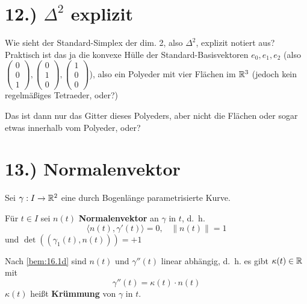 \documentclass[a5paper,oneside]{scrbook}
\begin{document}
\section*{12.) $\Delta^2$ explizit}
Wie sieht der Standard-Simplex der dim. 2, also $\Delta^2$, explizit
notiert aus? Praktisch ist das ja die konvexe Hülle der Standard-Basisvektoren
$e_0, e_1, e_2$ (also $\begin{pmatrix}0\\0\\1\end{pmatrix},\begin{pmatrix}0\\1\\0\end{pmatrix},\begin{pmatrix}1\\0\\0\end{pmatrix}$),
also ein Polyeder mit vier Flächen im $\mathbb{R}^3$ (jedoch kein regelmäßiges Tetraeder, oder?)

Das ist dann nur das Gitter dieses Polyeders, aber nicht die Flächen
oder sogar etwas innerhalb vom Polyeder, oder?

\section*{13.) Normalenvektor}
\begin{definition}%
    Sei $\gamma: I \rightarrow \mathbb{R}^2$ eine durch Bogenlänge
    parametrisierte Kurve.

    \begin{defenum}
        \item Für $t \in I$ sei $n(t)$ \textbf{Normalenvektor}
              an $\gamma$ in $t$, d.~h.
              \[\langle n(t), \gamma'(t) \rangle = 0, \;\;\; \|n(t)\|=1 \]
              und $\det((\gamma_1(t), n(t))) = +1$
        \item Nach \cref{bem:16.1d} sind $n(t)$ und $\gamma''(t)$ linear
              abhängig, d.~h. es gibt $\kappa(t) \in \mathbb{R}$ mit
              \[\gamma''(t) = \kappa(t) \cdot n(t)\]
              $\kappa(t)$ heißt \textbf{Krümmung}
              von $\gamma$ in $t$.
    \end{defenum}
\end{definition}
\end{document}
